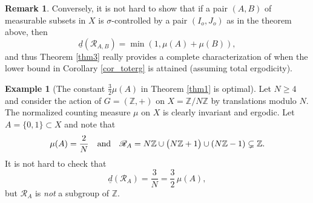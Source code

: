 \documentclass[10pt]{amsart}
\let\mathcal\mathscr
\newcommand{\cR}{\mathcal{R}}
\newcommand{\bZ}{\mathbb{Z}}
\newcommand{\qand}{\quad\textup{and}\quad}
\theoremstyle{plain}
\theoremstyle{definition}
\newtheorem{remark}[theorem]{Remark}
\newtheorem{example}{Example}[section]
\begin{document}
\begin{remark}
Conversely, it is not hard to show that if a pair $(A,B)$ of measurable subsets in $X$ is $\sigma$-controlled by a pair $(I_o,J_o)$ as in the theorem above, then
\[
\underline{d}(\cR_{A,B}) = \min(1,\mu(A) + \mu(B)),
\]
and thus Theorem \ref{thm3} really provides a complete characterization of when the lower bound in Corollary \ref{cor_toterg} is attained (assuming total ergodicity).
\end{remark}


\begin{example}[The constant $\frac{3}{2} \mu(A)$ in Theorem \ref{thm1} is optimal]
Let $N \geq 4$ and consider the action of $G = (\bZ,+)$ on $X = \bZ/N\bZ$ by translations modulo $N$. The normalized counting measure $\mu$
on $X$ is clearly invariant and ergodic. Let \hbox{$A\!=\!\{0,1\}\!\subset\!X$} and note that
\[
\mu(A) = \frac{2}{N} \qand \cR_{A} = N \bZ \cup \bigl(N\bZ + 1\bigr) \cup (N\bZ - 1) \subsetneq \bZ.
\]
It is not hard to check that
\[
\underline{d}(\cR_A) = \frac{3}{N} = \frac{3}{2}\, \mu(A),
\]
but $\cR_A$ is \emph{not} a subgroup of $\bZ$.
\end{example}
\end{document}
